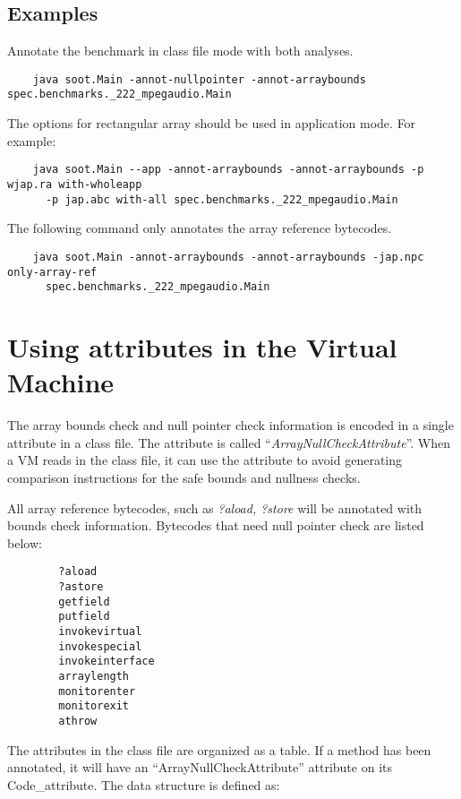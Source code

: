 \documentclass{article}
\begin{document}
\subsection{Examples}

Annotate the benchmark in class file mode with both analyses.
\begin{verbatim}
    java soot.Main -annot-nullpointer -annot-arraybounds spec.benchmarks._222_mpegaudio.Main
\end{verbatim}

The options for rectangular array should be used in application 
mode. For example:
\begin{verbatim}
    java soot.Main --app -annot-arraybounds -annot-arraybounds -p wjap.ra with-wholeapp 
      -p jap.abc with-all spec.benchmarks._222_mpegaudio.Main
\end{verbatim}

The following command only annotates the array reference bytecodes.
\begin{verbatim}
    java soot.Main -annot-arraybounds -annot-arraybounds -jap.npc only-array-ref 
      spec.benchmarks._222_mpegaudio.Main
\end{verbatim}


\section{Using attributes in the Virtual Machine}
The array bounds check and null pointer check information is encoded 
in a single attribute in a class file. The attribute is called 
``{\em ArrayNullCheckAttribute}''. When a VM reads in the class file, 
it can use the attribute to avoid generating comparison instructions for
the safe bounds and nullness checks. 

All array reference bytecodes, such as {\em ?aload, ?store} will be annotated 
with bounds check information. Bytecodes that need null pointer check 
are listed below:
\begin{verbatim}
        ?aload
        ?astore
        getfield
        putfield
        invokevirtual
        invokespecial
        invokeinterface
        arraylength
        monitorenter
        monitorexit
        athrow
\end{verbatim}

The attributes in the class file are organized as a table. If a method
has been annotated, it will have an ``ArrayNullCheckAttribute''
attribute on its Code\_attribute. The data structure is defined as:
\end{document}
